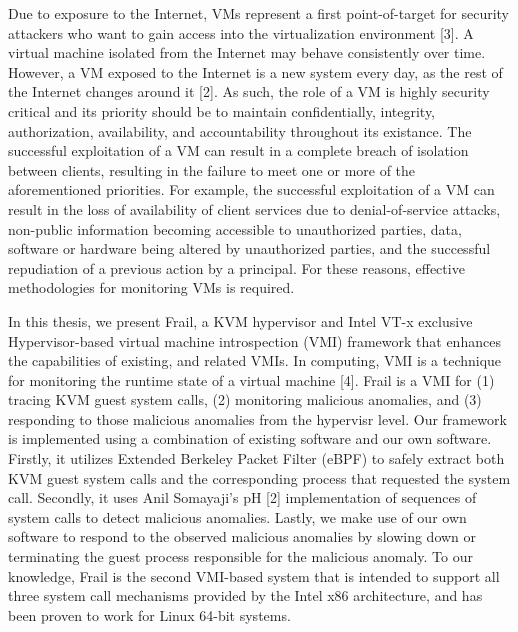 \documentclass{report}
\begin{document}
\begin{spacing}{1.5}
{\large 
Due to exposure to the Internet, VMs represent a first point-of-target for security attackers who want to gain access into the virtualization environment [3]. A virtual machine isolated from the Internet may behave consistently over time. However, a VM exposed to the Internet is a new system every day, as the rest of the Internet changes around it [2]. As such, the role of a VM is highly security critical and its priority should be to maintain confidentially, integrity, authorization, availability, and accountability throughout its existance. The successful exploitation of a VM can result in a complete breach of isolation between clients, resulting in the failure to meet one or more of the aforementioned priorities. For example, the successful exploitation of a VM can result in the loss of availability of client services due to denial-of-service attacks, non-public information becoming accessible to unauthorized parties, data, software or hardware being altered by unauthorized parties, and the successful repudiation of a previous action by a principal. For these reasons, effective methodologies for monitoring VMs is required.
\newline
}

{\large 
In this thesis, we present Frail, a KVM hypervisor and Intel VT-x exclusive Hypervisor-based virtual machine introspection (VMI) framework that enhances the capabilities of existing, and related VMIs. In computing, VMI is a technique for monitoring the runtime state of a virtual machine [4]. Frail is a VMI for (1) tracing KVM guest system calls, (2) monitoring malicious anomalies, and (3) responding to those malicious anomalies from the hypervisr level. Our framework is implemented using a combination of existing software and our own software. Firstly, it utilizes Extended Berkeley Packet Filter (eBPF) to safely extract both KVM guest system calls and the corresponding process that requested the system call. Secondly, it uses Anil Somayaji's pH [2] implementation of sequences of system calls to detect malicious anomalies. Lastly, we make use of our own software to respond to the observed malicious anomalies by slowing down or terminating the guest process responsible for the malicious anomaly. To our knowledge, Frail is the second VMI-based system that is intended to support all three system call mechanisms provided by the Intel x86 architecture, and has been proven to work for Linux 64-bit systems.
\newline
}






\end{spacing}
\end{document}
